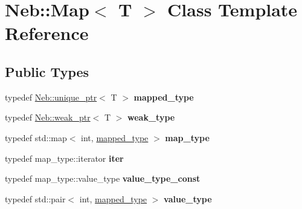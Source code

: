 \hypertarget{classNeb_1_1Map}{\section{\-Neb\-:\-:\-Map$<$ \-T $>$ \-Class \-Template \-Reference}
\label{classNeb_1_1Map}
}
\subsection*{\-Public \-Types}
\begin{DoxyCompactItemize}
\item 
\hypertarget{classNeb_1_1Map_a2803848f87f38d8ce8d563f7c95498a1}{typedef \hyperlink{classNeb_1_1unique__ptr}{\-Neb\-::unique\-\_\-ptr}$<$ \-T $>$ {\bfseries mapped\-\_\-type}}\label{classNeb_1_1Map_a2803848f87f38d8ce8d563f7c95498a1}

\item 
\hypertarget{classNeb_1_1Map_a1c3fc1b8c8704182490ce063857fd8ec}{typedef \hyperlink{classNeb_1_1weak__ptr}{\-Neb\-::weak\-\_\-ptr}$<$ \-T $>$ {\bfseries weak\-\_\-type}}\label{classNeb_1_1Map_a1c3fc1b8c8704182490ce063857fd8ec}

\item 
\hypertarget{classNeb_1_1Map_aff92d7127de1554a67d6c668f99c1f8e}{typedef std\-::map$<$ int, \*
\hyperlink{classNeb_1_1unique__ptr}{mapped\-\_\-type} $>$ {\bfseries map\-\_\-type}}\label{classNeb_1_1Map_aff92d7127de1554a67d6c668f99c1f8e}

\item 
\hypertarget{classNeb_1_1Map_aa1c580f6c0cb1fe57fce27233c56ac1c}{typedef map\-\_\-type\-::iterator {\bfseries iter}}\label{classNeb_1_1Map_aa1c580f6c0cb1fe57fce27233c56ac1c}

\item 
\hypertarget{classNeb_1_1Map_a9beb63846e033e9650dd4d3f2fb1eb2c}{typedef map\-\_\-type\-::value\-\_\-type {\bfseries value\-\_\-type\-\_\-const}}\label{classNeb_1_1Map_a9beb63846e033e9650dd4d3f2fb1eb2c}

\item 
\hypertarget{classNeb_1_1Map_a6fab819e1d3f93075362c71f2c69d8ca}{typedef std\-::pair$<$ int, \*
\hyperlink{classNeb_1_1unique__ptr}{mapped\-\_\-type} $>$ {\bfseries value\-\_\-type}}\label{classNeb_1_1Map_a6fab819e1d3f93075362c71f2c69d8ca}

\end{DoxyCompactItemize}
